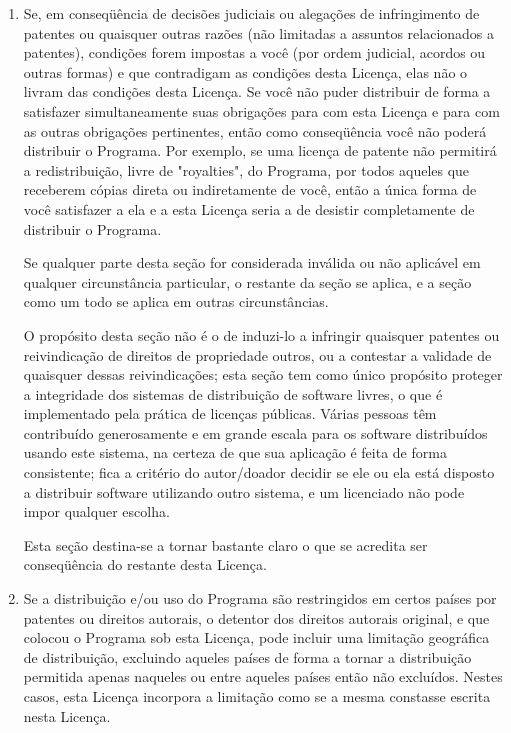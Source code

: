 {\begin{enumerate}
\item Se, em conseqüência de decisões judiciais ou alegações de
infringimento de patentes ou quaisquer outras razões (não limitadas a
assuntos relacionados a patentes), condições forem impostas a você
(por ordem judicial, acordos ou outras formas) e que contradigam as
condições desta Licença, elas não o livram das condições desta
Licença. Se você não puder distribuir de forma a satisfazer
simultaneamente suas obrigações para com esta Licença e para com as
outras obrigações pertinentes, então como conseqüência você não poderá
distribuir o Programa. Por exemplo, se uma licença de patente não
permitirá a redistribuição, livre de "royalties", do Programa, por
todos aqueles que receberem cópias direta ou indiretamente de você,
então a única forma de você satisfazer a ela e a esta Licença seria a
de desistir completamente de distribuir o Programa.

Se qualquer parte desta seção for considerada inválida ou não
aplicável em qualquer circunstância particular, o restante da seção se
aplica, e a seção como um todo se aplica em outras circunstâncias.

O propósito desta seção não é o de induzi-lo a infringir quaisquer
patentes ou reivindicação de direitos de propriedade outros, ou a
contestar a validade de quaisquer dessas reivindicações; esta seção
tem como único propósito proteger a integridade dos sistemas de
distribuição de software livres, o que é implementado pela prática de
licenças públicas. Várias pessoas têm contribuído generosamente e em
grande escala para os software distribuídos usando este sistema, na
certeza de que sua aplicação é feita de forma consistente; fica a
critério do autor/doador decidir se ele ou ela está disposto a
distribuir software utilizando outro sistema, e um licenciado não pode
impor qualquer escolha.

Esta seção destina-se a tornar bastante claro o que se acredita ser
conseqüência do restante desta Licença.

\item Se a distribuição e/ou uso do Programa são restringidos em certos
países por patentes ou direitos autorais, o detentor dos direitos
autorais original, e que colocou o Programa sob esta Licença, pode
incluir uma limitação geográfica de distribuição, excluindo aqueles
países de forma a tornar a distribuição permitida apenas naqueles ou
entre aqueles países então não excluídos. Nestes casos, esta Licença
incorpora a limitação como se a mesma constasse escrita nesta Licença.


\end{enumerate}}
